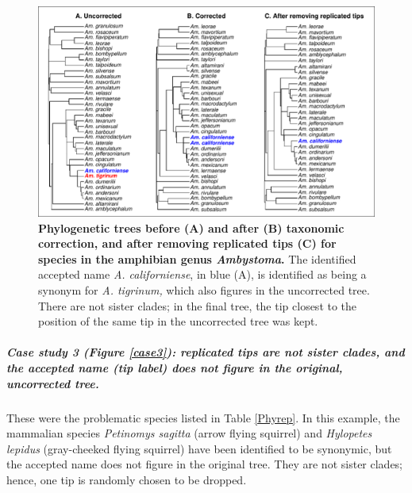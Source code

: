 \documentclass[11pt]{article}
\begin{document}
\begin{figure}[h!]
\centering
\includegraphics[scale=0.8]{figures/Case_studies/Case2}
\caption[Phylogenetic trees before (A) and after (B) taxonomic correction, and after removing replicated tips (C) for species in the amphibian genus \textit{Ambystoma}]{\textbf{Phylogenetic trees before (A) and after (B) taxonomic correction, and after removing replicated tips (C) for species in the amphibian genus \textit{Ambystoma}.} The identified accepted name \textit{A. californiense}, in blue (A), is identified as being a synonym for \textit{A. tigrinum,} which also figures in the uncorrected tree. There are not sister clades; in the final tree, the tip closest to the position of the same tip in the uncorrected tree was kept.}
\label{case2}
\end{figure}

\pagebreak
\subparagraph{Case study 3 (Figure \ref{case3}): replicated tips are not sister clades, and the accepted name (tip label) does not figure in the original, uncorrected tree.} These were the problematic species listed in Table \ref{Phyrep}. In this example, the mammalian species \textit{Petinomys sagitta} (arrow flying squirrel) and  \textit{Hylopetes lepidus} (gray-cheeked flying squirrel)  have been identified to be synonymic, but the accepted name does not figure in the original tree. They are not sister clades; hence, one tip is randomly chosen to be dropped.
\end{document}
